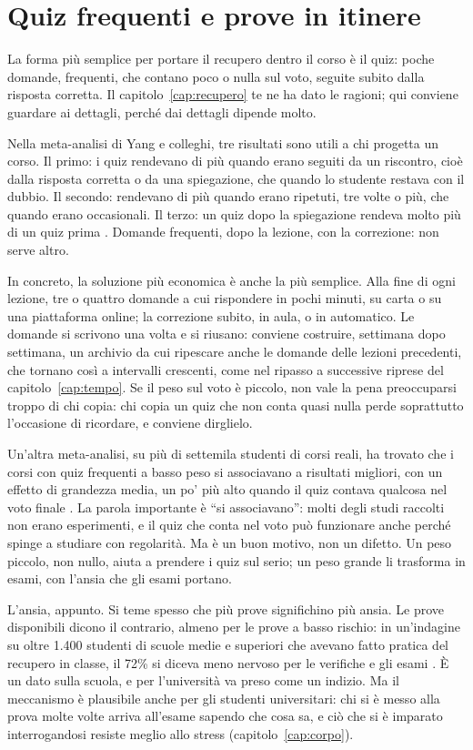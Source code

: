 \section{Quiz frequenti e prove in itinere}

La forma più semplice per portare il recupero dentro il corso è il
quiz: poche domande, frequenti, che contano poco o nulla sul voto,
seguite subito dalla risposta corretta. Il capitolo~\ref{cap:recupero}
te ne ha dato le ragioni; qui conviene guardare ai dettagli, perché
dai dettagli dipende molto.

Nella meta-analisi di Yang e colleghi, tre risultati sono utili a chi
progetta un corso. Il primo: i quiz rendevano di più quando erano
seguiti da un riscontro, cioè dalla risposta corretta o da una
spiegazione, che quando lo studente restava con il dubbio. Il secondo:
rendevano di più quando erano ripetuti, tre volte o più, che quando
erano occasionali. Il terzo: un quiz dopo la spiegazione rendeva molto
più di un quiz prima \parencite{yang2021}. Domande frequenti, dopo la
lezione, con la correzione: non serve altro.

In concreto, la soluzione più economica è anche la più semplice.
Alla fine di ogni lezione, tre o quattro domande a cui rispondere in
pochi minuti, su carta o su una piattaforma online; la correzione
subito, in aula, o in automatico. Le domande si scrivono una volta e
si riusano: conviene costruire, settimana dopo settimana, un archivio
da cui ripescare anche le domande delle lezioni precedenti, che
tornano così a intervalli crescenti, come nel ripasso a successive
riprese del capitolo~\ref{cap:tempo}. Se il peso sul voto è piccolo,
non vale la pena preoccuparsi troppo di chi copia: chi copia un quiz
che non conta quasi nulla perde soprattutto l'occasione di
ricordare, e conviene dirglielo.

Un'altra meta-analisi, su più di settemila studenti di corsi reali,
ha trovato che i corsi con quiz frequenti a basso peso si associavano a
risultati migliori, con un effetto di grandezza media, un po' più
alto quando il quiz contava qualcosa nel voto finale
\parencite{sotola2021}. La parola importante è \enquote{si
associavano}: molti degli studi raccolti non erano esperimenti, e il
quiz che conta nel voto può funzionare anche perché spinge a studiare
con regolarità. Ma è un buon motivo, non un difetto. Un peso piccolo,
non nullo, aiuta a prendere i quiz sul serio; un peso grande li
trasforma in esami, con l'ansia che gli esami portano.

L'ansia, appunto. Si teme spesso che più prove significhino più
ansia. Le prove disponibili dicono il contrario, almeno per le prove a
basso rischio: in un'indagine su oltre 1.400 studenti di scuole medie
e superiori che avevano fatto pratica del recupero in classe, il 72\%
si diceva meno nervoso per le verifiche e gli esami \parencite{agarwal2014}.
È un dato sulla scuola, e per l'università va preso come un indizio.
Ma il meccanismo è plausibile anche per gli studenti universitari: chi si è
messo alla prova molte volte arriva all'esame sapendo che cosa sa, e
ciò che si è imparato interrogandosi resiste meglio allo stress
(capitolo~\ref{cap:corpo}).

